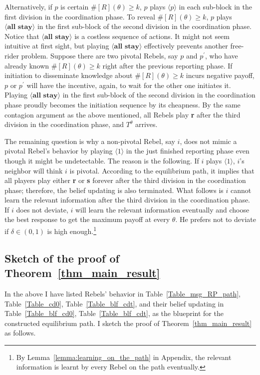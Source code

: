 \documentclass[12pt,letter]{article}
\theoremstyle{definition}
\theoremstyle{definition}
\theoremstyle{remark}
\theoremstyle{claim}
\begin{document}
Alternatively, if $p$ is certain $\#[R](\theta)\geq k$, $p$ plays $\langle p \rangle$ in each sub-block in the first division in the coordination phase. To reveal $\#[R](\theta)\geq k$, $p$ plays $\langle \textbf{all stay} \rangle$ in the first sub-block of the second division in the coordination phase. Notice that $\langle \textbf{all stay} \rangle$ is a costless sequence of actions. It might not seem intuitive at first sight, but playing $\langle \textbf{all stay} \rangle$ effectively prevents another free-rider problem. Suppose there are two pivotal Rebels, say $p$ and $p^{'}$, who have already known $\#[R](\theta)\geq k$ right after the previous reporting phase. If initiation to disseminate knowledge about $\#[R](\theta)\geq k$ incurs negative payoff, $p$ or $p^{'}$ will have the incentive, again, to wait for the other one initiates it. Playing $\langle \textbf{all stay} \rangle$ in the first sub-block of the second division in the coordination phase proudly becomes the initiation sequence by its cheapness. By the same contagion argument as the above mentioned, all Rebels play \textbf{r} after the third division in the coordination phase, and $T^{\theta}$ arrives.

The remaining question is why a non-pivotal Rebel, say $i$, does not mimic a pivotal Rebel's behavior by playing $\langle 1 \rangle$ in the just finished reporting phase even though it might be undetectable. The reason is the following. If $i$ plays $\langle 1 \rangle$, $i$'s neighbor will think $i$ is pivotal. According to the equilibrium path, it implies that all players play either \textbf{r} or \textbf{s} forever after the third division in the coordination phase; therefore, the belief updating is also terminated. What follows is $i$ cannot learn the relevant information after the third division in the coordination phase. If $i$ does not deviate, $i$ will learn the relevant information eventually and choose the best response to get the maximum payoff at every $\theta$. He prefers not to deviate if $\delta\in(0,1)$ is high enough.\footnote{By Lemma~\ref{lemma:learning_on_the_path} in Appendix, the relevant information is learnt by every Rebel on the path eventually.} 


\subsection{Sketch of the proof of Theorem~\ref{thm_main_result}}

In the above I have listed Rebels' behavior in Table~\ref{Table_msg_RP_path}, Table~\ref{Table_cd0}, Table~\ref{Table_blf_cdt}, and their belief updating in Table~\ref{Table_blf_cd0}, Table~\ref{Table_blf_cdt}, as the blueprint for the constructed equilibrium path. I sketch the proof of Theorem~\ref{thm_main_result} as follows.
\end{document}
